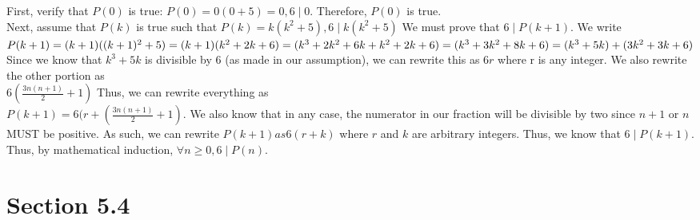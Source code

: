 \documentclass{article}
\begin{document}
\begin{enumerate}
    First, verify that $P(0)$ is true: $P(0) = 0(0+5) = 0, 6\mid0$. Therefore, $P(0)$ is true.\\
    Next, assume that $P(k)$ is true such that $P(k) = k(k^2+5), 6\mid k(k^2+5)$
    We must prove that $6\mid P(k+1)$. We write $P(k+1) = (k+1)((k+1)^2+5)\\=(k+1)(k^2+2k+6)=(k^3+2k^2+6k+k^2+2k+6)=(k^3+3k^2+8k+6)\\=(k^3+5k)+(3k^2+3k+6)$
    Since we know that $k^3+5k$ is divisible by 6 (as made in our assumption), we can rewrite this as $6r$ where r is any integer. We also rewrite the other portion as\\
    $6(\frac{3n(n+1)}{2}+1)$ Thus, we can rewrite everything as \\$P(k+1) = 6(r+(\frac{3n(n+1)}{2}+1)$. We also know that in any case, the numerator in our fraction will be divisible by two since $n+1$ or $n$ MUST be positive. As such, we can rewrite $P(k+1) as 6(r+k)$ where $r$ and $k$ are arbitrary integers. Thus, we know that $6\mid P(k+1).$ Thus, by mathematical induction, $\forall n\geq0, 6\mid P(n).$
\end{enumerate}

\section{Section 5.4}
\end{document}

